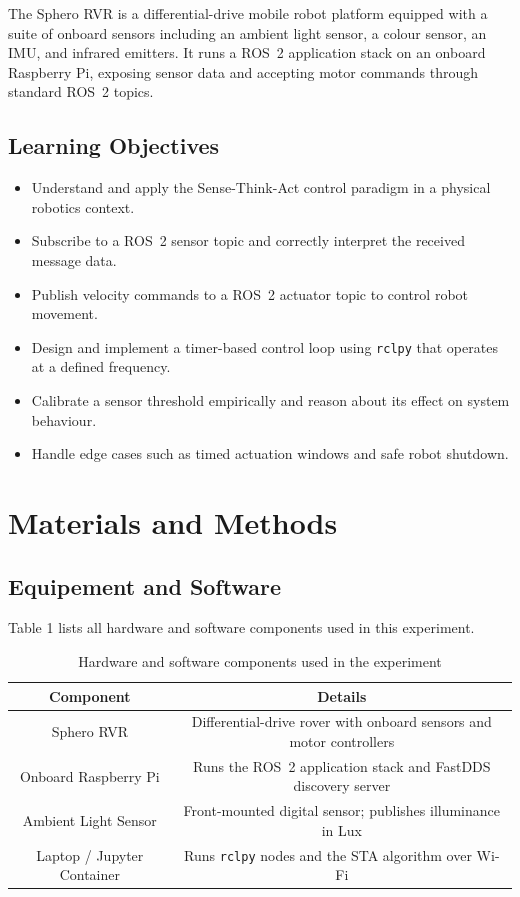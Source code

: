 \documentclass[11 pt , a 4 paper ]{article}
\theoremstyle{definition}
\begin{document}
	\noindent The Sphero RVR is a differential-drive mobile robot platform equipped with a suite of onboard sensors including an ambient light sensor, a colour sensor, an IMU, and infrared emitters. It runs a ROS~2 application stack on an onboard Raspberry Pi, exposing sensor data and accepting motor commands through standard ROS~2 topics.

	
	
	\subsection{Learning Objectives}
	
	\begin{itemize}
		\item Understand and apply the Sense-Think-Act control paradigm in a physical
		robotics context.
		\item Subscribe to a ROS~2 sensor topic and correctly interpret the received
		message data.
		\item Publish velocity commands to a ROS~2 actuator topic to control robot
		movement.
		\item Design and implement a timer-based control loop using \texttt{rclpy}
		that operates at a defined frequency.
		\item Calibrate a sensor threshold empirically and reason about its effect on
		system behaviour.
		\item Handle edge cases such as timed actuation windows and safe robot
		shutdown.
	\end{itemize}
  \section{Materials and Methods}
  
	\subsection{Equipement and Software}
	Table 1 lists all hardware and software components used in this experiment.
	\begin{center}
		\begin{table}[hbt!]
			\label{ES}
			\vskip 5pt
			\centering\begin{tabular}{|c|c|}
				\hline
					\textbf{Component} & \textbf{Details}\\
					\hline
					Sphero RVR & Differential-drive rover with onboard sensors and motor controllers\\
					\hline
					Onboard Raspberry Pi & Runs the ROS~2 application stack and FastDDS discovery server\\
					\hline
					Ambient Light Sensor & Front-mounted digital sensor; publishes illuminance in Lux\\
					\hline
					Laptop / Jupyter Container &
					Runs \texttt{rclpy} nodes and the STA algorithm over Wi-Fi \\
					\hline
			\end{tabular}
			\caption{Hardware and software components used in the experiment}
		\end{table}
	\end{center}
	
\end{document}
